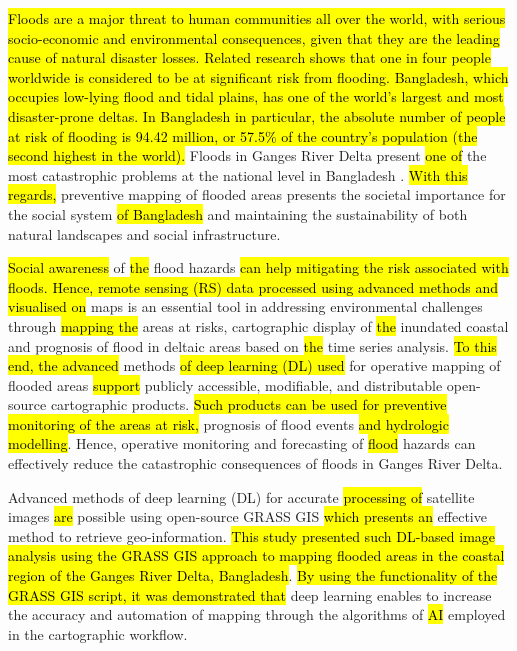 \documentclass[water,article,submit,pdftex,moreauthors]{Definitions/mdpi}
\begin{document}
\hl{Floods are a major threat to human communities all over the world, with serious socio-economic and environmental consequences, given that they are the leading cause of natural disaster losses. Related research shows that one in four people worldwide is considered to be at significant risk from flooding. Bangladesh, which occupies low-lying flood and tidal plains, has one of the world's largest and most disaster-prone deltas. In Bangladesh in particular, the absolute number of people at risk of flooding is 94.42 million, or 57.5\% of the country's population (the second highest in the world). }Floods in Ganges River Delta present \hl{one of }the most catastrophic problems at the national level in Bangladesh \cite{Szabo}. \hl{With this regards, }preventive mapping of flooded areas presents the societal importance for the social system \hl{of Bangladesh }and maintaining the sustainability of both natural landscapes and social infrastructure. 

\hl{Social awareness} of \hl{the} flood hazards \hl{can help mitigating the risk associated with floods. Hence, remote sensing (RS) data processed using advanced methods and visualised on} maps is an essential tool in addressing environmental challenges through \hl{mapping the} areas at risks, cartographic display of \hl{the }inundated coastal and prognosis of flood in deltaic areas based on \hl{the }time series analysis. \hl{To this end, the advanced} methods \hl{of deep learning (DL) used }for operative mapping of flooded areas \hl{support} publicly accessible, modifiable, and distributable open-source cartographic products. \hl{Such products can be used for preventive monitoring of the areas at risk, }prognosis of flood events \hl{and hydrologic modelling}. Hence, operative monitoring and forecasting of \hl{flood} hazards can effectively reduce the catastrophic consequences of floods in Ganges River Delta. 

Advanced methods of deep learning (DL) for accurate \hl{processing of }satellite images \hl{are} possible using open-source GRASS GIS \hl{which presents an} effective method to retrieve geo-information. \hl{This study presented such DL-based image analysis using the GRASS GIS approach to mapping flooded areas in the coastal region of the Ganges River Delta, Bangladesh}. \hl{By using the functionality of the GRASS GIS script, it was demonstrated that }deep learning\hl{ }enables to increase the accuracy and automation of mapping through the algorithms of \hl{AI} employed in the cartographic workflow. 
\end{document}
